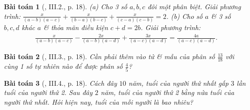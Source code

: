 \documentclass{article}
\newtheorem{baitoan}{Bài toán}
\begin{document}
\begin{baitoan}[\cite{SBT_Toan_8_tap_2}, III.2., p. 18]
	(a) Cho 3 số $a,b,c$ đôi một phân biệt. Giải phương trình: $\frac{x}{(a - b)(a - c)} + \frac{x}{(b - a)(b - c)} + \frac{x}{(c - a)(c - b)} = 2$. (b) Cho số $a$ \& 3 số $b,c,d$ khác $a$ \& thỏa mãn điều kiện $c + d = 2b$. Giải phương trình:
	\begin{align*}
		\frac{x}{(a - b)(a - c)} - \frac{2x}{(a - b)(a - d)} + \frac{3x}{(a - c)(a - d)} = \frac{4a}{(a - c)(a - d)}.
	\end{align*}
\end{baitoan}

\begin{baitoan}[\cite{SBT_Toan_8_tap_2}, III.3., p. 18]
	Cần phải thêm vào tử \& mẫu của phân số $\frac{13}{18}$ với cùng 1 số tự nhiên nào để được phân số $\frac{4}{5}$?
\end{baitoan}

\begin{baitoan}[\cite{SBT_Toan_8_tap_2}, III.4., p. 18]
	Cách đây $10$ năm, tuổi của người thứ nhất gấp $3$ lần tuổi của người thứ 2. Sau đây $2$ năm, tuổi của người thứ 2 bằng nửa tuổi của người thứ nhất. Hỏi hiện nay, tuổi của mỗi người là bao nhiêu?
\end{baitoan}


\printbibliography[heading=bibintoc]
	
\end{document}
